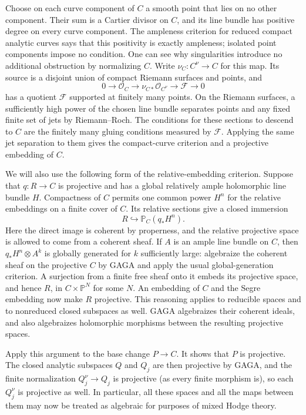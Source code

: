 \documentclass[11pt]{amsart}
\theoremstyle{definition}
\theoremstyle{remark}
\numberwithin{equation}{section}
\begin{document}
Choose on each curve component of $C$ a smooth point that lies on no
other component.  Their sum is a Cartier divisor on $C$, and its line
bundle has positive degree on every curve component.  The ampleness
criterion for reduced compact analytic curves says that this positivity
is exactly ampleness; isolated point components impose no condition.
One can see why singularities introduce no additional obstruction by
normalizing $C$.  Write $\nu_C\colon C^\nu\to C$ for this map.  Its
source is a disjoint union of compact Riemann surfaces and points, and
\[
 0\longrightarrow\mathcal O_C\longrightarrow
   \nu_{C*}\mathcal O_{C^\nu}\longrightarrow\mathcal F\longrightarrow0
\]
has a quotient $\mathcal F$ supported at finitely many points.  On the
Riemann surfaces, a sufficiently high power of the chosen line bundle
separates points and any fixed finite set of jets by Riemann--Roch.
The conditions for these sections to descend to $C$ are the finitely
many gluing conditions measured by $\mathcal F$.  Applying the same
jet separation to them gives the compact-curve criterion and a
projective embedding of $C$.

We will also use the following form of the relative-embedding
criterion.  Suppose that $q\colon R\to C$ is projective and has a
global relatively ample holomorphic line bundle $H$.  Compactness of
$C$ permits one common power $H^n$ for the relative embeddings on a
finite cover of $C$.  Its relative sections give a closed immersion
\[
 R\hookrightarrow\mathbb P_C(q_*H^n).
\]
Here the direct image is coherent by properness, and the relative
projective space is allowed to come from a coherent sheaf.  If $A$ is
an ample line bundle on $C$, then $q_*H^n\otimes A^k$ is globally
generated for $k$ sufficiently large: algebraize the coherent sheaf
on the projective $C$ by GAGA
\cite[Section~12, Theorems~1--3]{SerreGAGA} and apply the usual global-generation
criterion.  A surjection from a finite free sheaf onto it embeds its
projective space, and hence $R$, in $C\times\mathbb P^N$ for some
$N$.  An embedding of $C$ and the Segre embedding now make $R$
projective.  This reasoning applies to reducible spaces and to
nonreduced closed subspaces as well.  GAGA algebraizes their coherent
ideals, and also algebraizes holomorphic morphisms between the resulting
projective spaces.

Apply this argument to the base change $P\to C$.  It shows that $P$
is projective.  The closed analytic subspaces $Q$ and $Q_j$ are then
projective by GAGA, and the finite normalization $Q_j^\nu\to Q_j$
is projective (as every finite morphism is), so each $Q_j^\nu$ is
projective as well.  In particular,
all these spaces and all the maps between them may now be treated as
algebraic for purposes of mixed Hodge theory.
\end{document}

